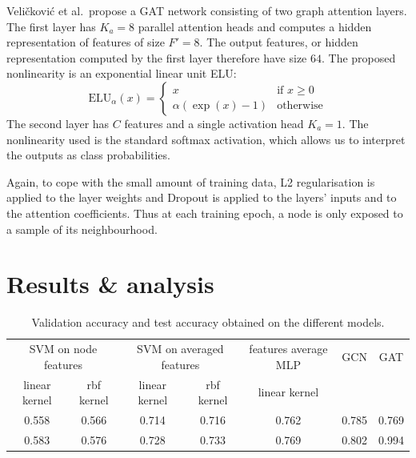 \documentclass[12pt]{article}
\theoremstyle{definition}
\begin{document}
\bigskip

Veli{\v{c}}kovi{\'{c}} et al.\ propose a GAT network consisting of two graph attention layers. The first layer has $K_a=8$ parallel attention heads and computes a hidden representation of features of size $F'=8$. The output features, or hidden representation computed by the first layer therefore have size $64$. The proposed nonlinearity is an exponential linear unit ELU:
\[
\textrm{ELU}_{\alpha}(x) = 
	\begin{cases}
		x &\text{if $x \ge 0$}\\
		\alpha (\exp(x) - 1) &\text{otherwise}
	\end{cases}
\]
The second layer has $C$ features and a single activation head $K_a=1$. The nonlinearity used is the standard softmax activation, which allows us to interpret the outputs as class probabilities.

Again, to cope with the small amount of training data, L2 regularisation is applied to the layer weights and Dropout \cite{srivastava2014dropout} is applied to the layers' inputs and to the attention coefficients. Thus at each training epoch, a node is only exposed to a sample of its neighbourhood. 

\section{Results \& analysis}

\begin{table}[h]
\centering	
\begin{tabular}{ |c c|c c|c|c|c| } 
 \hline
 \multicolumn{2}{|c|}{SVM on node features} & \multicolumn{2}{|c|}{SVM on averaged features} & features average MLP & GCN & GAT\\
 linear kernel & rbf kernel & linear kernel & rbf kernel & linear kernel & &\\
 \hline
 \hline
 0.558 &  0.566 & 0.714 & 0.716 & 0.762 & 0.785 & 0.769\\ 
 0.583 &  0.576 & 0.728 & 0.733 & 0.769 & 0.802 & 0.994\\ 
 \hline
\end{tabular}
\caption{Validation accuracy and test accuracy obtained on the different models.}
\end{table}
\end{document}
